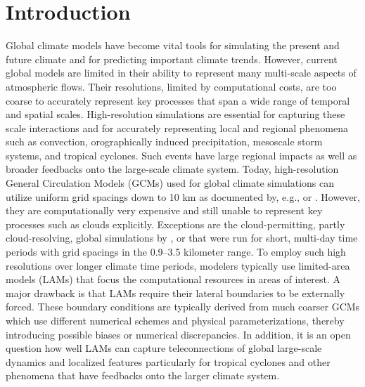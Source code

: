 \section{Introduction}
\label{sec:introduction}
Global climate models have become vital tools for
simulating the present and future climate and for predicting important
climate trends.  However, current global models are limited in their
ability to represent many multi-scale aspects of atmospheric flows.
Their resolutions, limited by computational costs, are too coarse to
accurately represent key processes that span a wide range of temporal
and spatial scales.  High-resolution simulations are essential for
capturing these scale interactions and for accurately representing local
and regional phenomena such as convection, orographically induced
precipitation, mesoscale storm systems, and tropical cyclones.  Such
events have large regional impacts as well as broader feedbacks onto the
large-scale climate system.  Today, high-resolution General Circulation
Models (GCMs) used for global climate simulations can utilize uniform
grid spacings down to 10 km as documented by, e.g.,
\cite{manganello:12} or
\cite{kinter:13}.  However, they are computationally very expensive and
still unable to represent key processes such as clouds explicitly.
Exceptions are the cloud-permitting, partly cloud-resolving, global
simulations by
\cite{miura:07},
\cite{putman:11} or
\cite{miyamoto:13} that were run for short, multi-day time periods with
grid spacings in the 0.9--3.5 kilometer range.  To employ such high
resolutions over longer climate time periods, modelers typically use
limited-area models (LAMs) that focus the computational resources in
areas of interest.  A major drawback is that LAMs require their lateral
boundaries to be externally forced.  These boundary conditions are
typically derived from much coarser GCMs which use different numerical
schemes and physical parameterizations, thereby introducing possible
biases or numerical discrepancies.  In addition, it is an open question
how well LAMs can capture teleconnections of global large-scale dynamics
and localized features particularly for tropical cyclones and other
phenomena that have feedbacks onto the larger climate system.

